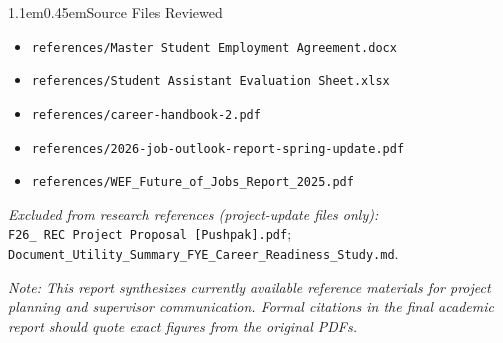 \documentclass[11pt,letterpaper]{article}
\makeatletter
\renewcommand\section{\@startsection{section}{1}{\z@}%
  {1.1em}{0.45em}{\large\bfseries}}
\makeatother
\begin{document}
\section{Source Files Reviewed}
\begin{itemize}
  \item \texttt{references/Master Student Employment Agreement.docx}
  \item \texttt{references/Student Assistant Evaluation Sheet.xlsx}
  \item \texttt{references/career-handbook-2.pdf}
  \item \texttt{references/2026-job-outlook-report-spring-update.pdf}
  \item \texttt{references/WEF\_Future\_of\_Jobs\_Report\_2025.pdf}
\end{itemize}

\vspace{0.4em}
\noindent\textit{Excluded from research references (project-update files only):}\\
\texttt{F26\_ REC Project Proposal [Pushpak].pdf};\\
\texttt{Document\_Utility\_Summary\_FYE\_Career\_Readiness\_Study.md}.

\vspace{1em}
{\footnotesize\textit{Note: This report synthesizes currently available reference materials for project planning and supervisor communication. Formal citations in the final academic report should quote exact figures from the original PDFs.}}
\end{document}

